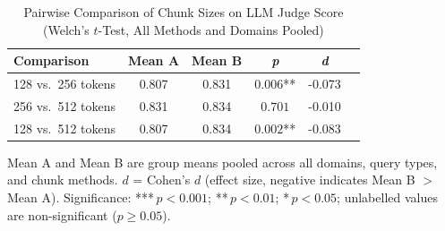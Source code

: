 \begin{table}[!t]
  \caption{Pairwise Comparison of Chunk Sizes on LLM Judge Score (Welch's $t$-Test, All Methods and Domains Pooled)}
  \label{tab:chunking_pairwise}
  \centering
  \renewcommand{\arraystretch}{1.2}
  \begin{tabular}{lccccc}
    \hline
    \textbf{Comparison} & \textbf{Mean A} & \textbf{Mean B} & \textbf{\textit{p}} & \textbf{\textit{d}} \\
    \hline
    128 vs.\ 256 tokens & 0.807 & 0.831 & $0.006$** & -0.073 \\
    256 vs.\ 512 tokens & 0.831 & 0.834 & $0.701$\phantom{***} & -0.010 \\
    128 vs.\ 512 tokens & 0.807 & 0.834 & $0.002$** & -0.083 \\
    \hline
  \end{tabular}
  \begin{tablenotes}
    \small
    \item Mean A and Mean B are group means pooled across all domains, query types, and chunk methods.
    $d$ = Cohen's $d$ (effect size, negative indicates Mean B $>$ Mean A).
    Significance: ***\,$p < 0.001$; **\,$p < 0.01$; *\,$p < 0.05$;
    unlabelled values are non-significant ($p \geq 0.05$).
  \end{tablenotes}
\end{table}
